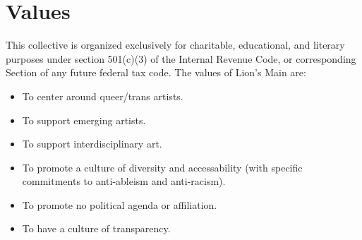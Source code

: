 \chapter{Values}\label{sec:values}

This collective is organized exclusively for charitable, educational, and literary purposes under section 501(c)(3) of the Internal Revenue Code, or corresponding Section of any future federal tax code. The values of Lion's Main are:

\begin{itemize}
  \item To center around queer/trans artists.
  \item To support emerging artists.
  \item To support interdisciplinary art.
  \item To promote a culture of diversity and accessability (with specific commitments to anti-ableism and anti-racism).
  \item To promote no political agenda or affiliation.
  \item To have a culture of transparency.
\end{itemize}
